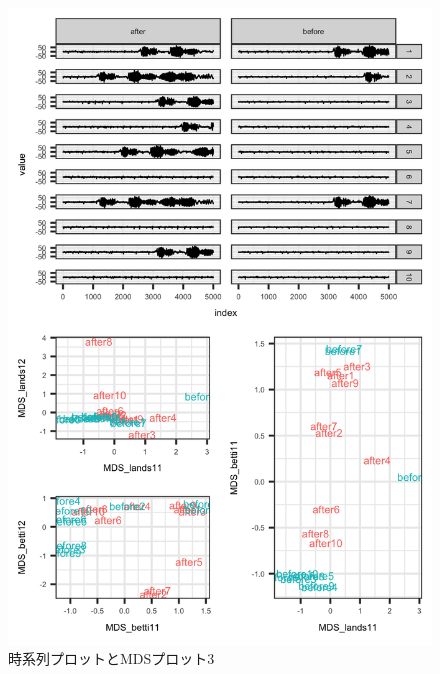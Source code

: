 \documentclass{jarticle}
\begin{document}
\begin{figure}[H]
	\begin{center}
		\includegraphics[width=15cm]{fig/MDS_plot3.png}
		\caption{時系列プロットとMDSプロット3}
		\label{fig:MDS_plot3}
	\end{center}
\end{figure}
\end{document}
